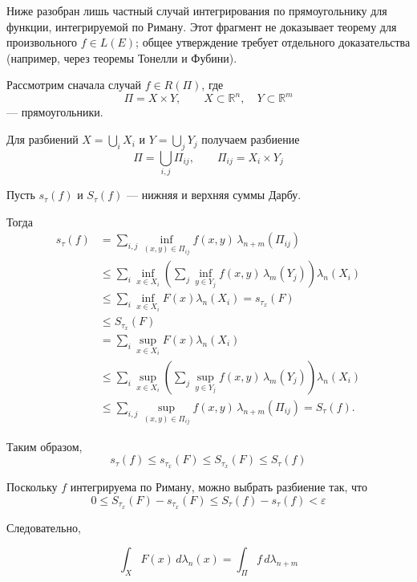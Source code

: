 \documentclass[12pt,a4paper]{article}
\begin{document}
\begin{proofbox}{}
    Ниже разобран лишь частный случай интегрирования по прямоугольнику для функции, интегрируемой по Риману. Этот фрагмент не доказывает теорему для произвольного $f\in L(E)$; общее утверждение требует отдельного доказательства (например, через теоремы Тонелли и Фубини).

    Рассмотрим сначала случай $f\in R(\Pi)$, где
    \[
        \Pi=X\times Y,
        \qquad
        X\subset\mathbb R^n,\quad
        Y\subset\mathbb R^m
    \]
    --- прямоугольники.

    Для разбиений $X=\bigcup_iX_i$ и
    $Y=\bigcup_jY_j$ получаем разбиение
    \[
        \Pi=\bigcup_{i,j}\Pi_{ij},
        \qquad
        \Pi_{ij}=X_i\times Y_j
    \]

    Пусть $s_\tau(f)$ и $S_\tau(f)$ --- нижняя и верхняя
    суммы Дарбу.

    Тогда
    \begin{align*}
        s_\tau(f)
        &=\sum_{i,j}
        \inf_{(x,y)\in\Pi_{ij}}f(x,y)
        \,\lambda_{n+m}(\Pi_{ij})\\
        &\leqslant
        \sum_i\inf_{x\in X_i}
        \left(
        \sum_j\inf_{y\in Y_j}f(x,y)
        \,\lambda_m(Y_j)
        \right)\lambda_n(X_i)\\
        &\leqslant
        \sum_i\inf_{x\in X_i}F(x)\lambda_n(X_i)
        =s_{\tau_x}(F)\\
        &\leqslant S_{\tau_x}(F)\\
        &=
        \sum_i\sup_{x\in X_i}F(x)\lambda_n(X_i)\\
        &\leqslant
        \sum_i\sup_{x\in X_i}
        \left(
        \sum_j\sup_{y\in Y_j}f(x,y)
        \,\lambda_m(Y_j)
        \right)\lambda_n(X_i)\\
        &\leqslant
        \sum_{i,j}\sup_{(x,y)\in\Pi_{ij}}f(x,y)
        \,\lambda_{n+m}(\Pi_{ij})
        =S_\tau(f).
    \end{align*}

    Таким образом,
    \[
        s_\tau(f)\leqslant s_{\tau_x}(F)
        \leqslant S_{\tau_x}(F)\leqslant S_\tau(f)
    \]

    Поскольку $f$ интегрируема по Риману, можно выбрать
    разбиение так, что
    \[
        0\leqslant S_{\tau_x}(F)-s_{\tau_x}(F)
        \leqslant S_\tau(f)-s_\tau(f)<\varepsilon
    \]

    Следовательно,

    \[
        \int_X F(x)\,d\lambda_n(x)
        =
        \int_\Pi f\,d\lambda_{n+m}
    \]

\end{proofbox}
\end{document}
